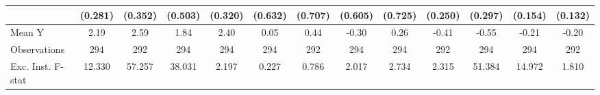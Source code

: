 {\begin{tabular}{l*{12}{c}}
            &     (0.281)         &     (0.352)         &     (0.503)         &     (0.320)         &     (0.632)         &     (0.707)         &     (0.605)         &     (0.725)         &     (0.250)         &     (0.297)         &     (0.154)         &     (0.132)         \\
\midrule
Mean Y      &        2.19         &        2.59         &        1.84         &        2.40         &        0.05         &        0.44         &       -0.30         &        0.26         &       -0.41         &       -0.55         &       -0.21         &       -0.20         \\
Observations&         294         &         292         &         294         &         294         &         294         &         292         &         294         &         294         &         292         &         294         &         294         &         292         \\
Exc. Inst. F-stat&      12.330         &      57.257         &      38.031         &       2.197         &       0.227         &       0.786         &       2.017         &       2.734         &       2.315         &      51.384         &      14.972         &       1.810         \\
\bottomrule
\end{tabular}
}

